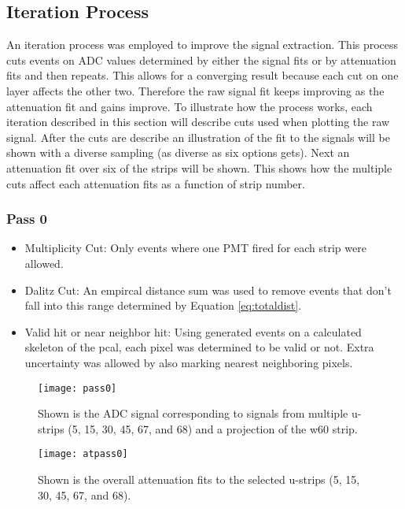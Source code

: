 \FloatBarrier
\subsection{Iteration Process}
An iteration process was employed to improve the signal extraction. This process cuts events on
 ADC values determined by either the signal fits or by attenuation fits and then repeats. This 
 allows for a converging result because each cut on one layer affects the other two. Therefore
  the raw signal fit keeps improving as the attenuation fit and gains improve. To illustrate 
  how the process works, each iteration described in this section will describe cuts used when 
  plotting the raw signal. After the cuts are describe an illustration of the fit to the signals 
  will be shown with a diverse sampling (as diverse as six options gets). Next an attenuation 
  fit over six of the strips will be shown. This shows how the multiple cuts affect each attenuation 
  fits as a function of strip number. 

\clearpage
\FloatBarrier
\subsubsection{Pass 0}
\begin{itemize}
    \item Multiplicity Cut: Only events where one PMT fired for each strip were allowed.
    \item Dalitz Cut: An empircal distance sum was used to remove events that don't fall into 
    this range determined by Equation \ref{eq:totaldist}.
    \item Valid hit or near neighbor hit: Using generated events on a calculated skeleton of 
    the pcal, each pixel was determined to be valid or not. Extra uncertainty was allowed by 
    also marking nearest neighboring pixels.
\end{itemize}

\begin{figure}[h]
    \centering
    \texttt{[image: pass0]}
    \caption{Shown is the ADC signal corresponding to signals from multiple u-strips 
    (5, 15, 30, 45, 67, and 68) and a projection of the w60 strip.}
    \label{fig:pass0}
\end{figure}

\begin{figure}[h]
    \centering
    \texttt{[image: atpass0]}
    \caption{Shown is the overall attenuation fits to the selected u-strips 
    (5, 15, 30, 45, 67, and 68).}
    \label{fig:atpass0}
\end{figure}


